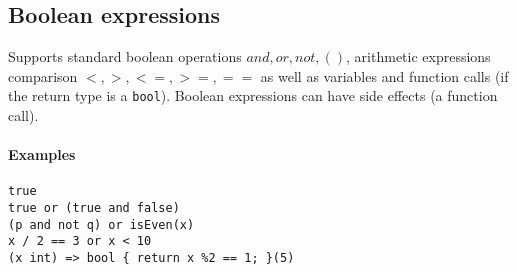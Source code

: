 \documentclass{article}
\begin{document}
\subsection{Boolean expressions}
Supports standard boolean operations $and, or, not, ()$, arithmetic expressions
comparison $<, >, <=, >=, ==$ as well as variables and function calls (if the
return type is a \texttt{bool}). Boolean expressions can have side effects
(a function call).

\paragraph{Examples}
\texttt{true} \\
\texttt{true or (true and false)} \\
\texttt{(p and not q) or isEven(x)} \\
\texttt{x / 2 == 3 or x < 10} \\
\texttt{(x int) => bool \{ return x \%2 == 1; \}(5) }
\end{document}
